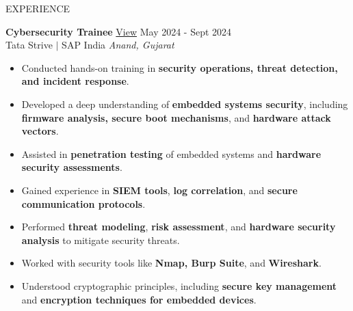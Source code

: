 \documentclass{resume} %
\begin{document}
\begin{rSection}{EXPERIENCE}

\textbf{Cybersecurity Trainee} \href{https://bit.ly/basakstrive}{View} \hfill May 2024 - Sept 2024\\
Tata Strive $|$ SAP India \hfill \textit{Anand, Gujarat}
 \begin{itemize}
    \itemsep -3pt {}
    \item Conducted hands-on training in \textbf{security operations, threat detection, and incident response}.
    \item Developed a deep understanding of \textbf{embedded systems security}, including \textbf{firmware analysis, secure boot mechanisms}, and \textbf{hardware attack vectors}.
    \item Assisted in \textbf{penetration testing} of embedded systems and \textbf{hardware security assessments}.
    \item Gained experience in \textbf{SIEM tools}, \textbf{log correlation}, and \textbf{secure communication protocols}.
    \item Performed \textbf{threat modeling}, \textbf{risk assessment}, and \textbf{hardware security analysis} to mitigate security threats.
    \item Worked with security tools like \textbf{Nmap, Burp Suite}, and \textbf{Wireshark}.
    \item Understood cryptographic principles, including \textbf{secure key management} and \textbf{encryption techniques for embedded devices}.
 \end{itemize}


\end{rSection}
\end{document}
